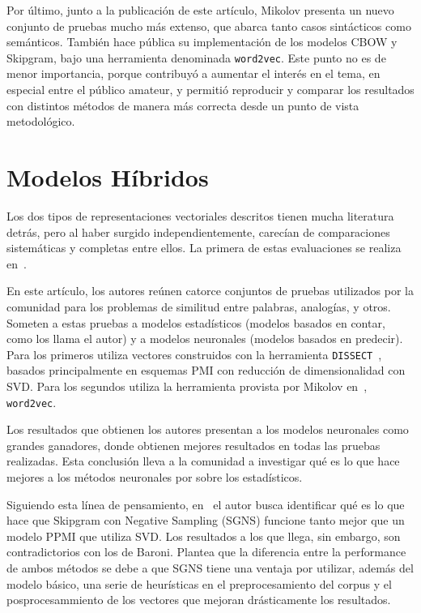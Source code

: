 Por último, junto a la publicación de este artículo, Mikolov presenta un nuevo conjunto de pruebas
mucho más extenso, que abarca tanto casos sintácticos como semánticos. También hace pública su
implementación de los modelos CBOW y Skipgram, bajo una herramienta denominada
\texttt{word2vec}. Este punto no es de menor importancia, porque contribuyó a aumentar el interés en
el tema, en especial entre el público amateur, y permitió reproducir y comparar los resultados con
distintos métodos de manera más correcta desde un punto de vista metodológico.


\section{Modelos Híbridos}

Los dos tipos de representaciones vectoriales descritos tienen mucha literatura detrás, pero al
haber surgido independientemente, carecían de comparaciones sistemáticas y completas entre ellos. La
primera de estas evaluaciones se realiza en~\cite{Baroni2014}.

En este artículo, los autores reúnen catorce conjuntos de pruebas utilizados por la comunidad para
los problemas de similitud entre palabras, analogías, y otros. Someten a estas pruebas a modelos
estadísticos (modelos basados en contar, como los llama el autor) y a modelos neuronales (modelos
basados en predecir). Para los primeros utiliza vectores construidos con la herramienta
\texttt{DISSECT}~\cite{Dinu2013}, basados principalmente en esquemas PMI con reducción de
dimensionalidad con SVD\@. Para los segundos utiliza la herramienta provista por Mikolov
en~\cite{Mikolov2013c}, \texttt{word2vec}.

Los resultados que obtienen los autores presentan a los modelos neuronales como grandes ganadores,
donde obtienen mejores resultados en todas las pruebas realizadas. Esta conclusión lleva a la
comunidad a investigar qué es lo que hace mejores a los métodos neuronales por sobre los
estadísticos.

Siguiendo esta línea de pensamiento, en~\cite{Levy2015} el autor busca identificar qué es lo que
hace que Skipgram con Negative Sampling (SGNS) funcione tanto mejor que un modelo PPMI que utiliza
SVD\@. Los resultados a los que llega, sin embargo, son contradictorios con los de Baroni. Plantea
que la diferencia entre la performance de ambos métodos se debe a que SGNS tiene una ventaja por
utilizar, además del modelo básico, una serie de heurísticas en el preprocesamiento del corpus y el
posprocesammiento de los vectores que mejoran drásticamente los resultados.

